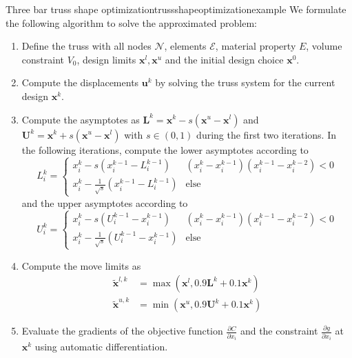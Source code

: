 \begin{example}{Three bar truss shape optimization}{trussshapeoptimizationexample}
    We formulate the following algorithm to solve the approximated problem: 
    \begin{enumerate}
        \item Define the truss with all nodes $\mathcal{N}$, elements $\mathcal{E}$, material property $E$, volume constraint $V_0$, design limits $\mathbf{x}^l, \mathbf{x}^u$ and the initial design choice $\mathbf{x}^0$.
        \item Compute the displacements $\mathbf{u}^k$ by solving the truss system for the current design $\mathbf{x}^k$.
        \item Compute the asymptotes as $\mathbf{L}^k =\mathbf{x}^k - s (\mathbf{x}^u - \mathbf{x}^l)$ and $\mathbf{U}^k =\mathbf{x}^k + s (\mathbf{x}^u - \mathbf{x}^l)$ with $s \in (0,1)$ during the first two iterations. In the following iterations, compute the lower asymptotes according to 
        \begin{equation}
            L^k_i = 
            \begin{cases}
                x^k_i - s  (x^{k-1}_i-L^{k-1}_i) & (x_i^k-x_i^{k-1})(x_i^{k-1}-x_i^{k-2}) < 0\\
                x^k_i - \frac{1}{\sqrt{s}}  (x^{k-1}_i-L^{k-1}_i) & \text{else}
            \end{cases}
        \end{equation}
        and the upper asymptotes according to 
        \begin{equation}
            U^k_i = 
            \begin{cases}
                x^k_i - s  (U^{k-1}_i-x^{k-1}_i) & (x_i^k-x_i^{k-1})(x_i^{k-1}-x_i^{k-2}) < 0\\
                x^k_i - \frac{1}{\sqrt{s}}  (U^{k-1}_i-x^{k-1}_i) & \text{else}
            \end{cases}
        \end{equation}

        \item Compute the move limits as 
        \begin{align}
            \tilde{\mathbf{x}}^{l,k} &= \max(\mathbf{x}^l,  0.9 \mathbf{L}^k + 0.1 \mathbf{x}^k) \\
            \tilde{\mathbf{x}}^{u,k} &= \min(\mathbf{x}^u,  0.9 \mathbf{U}^k + 0.1 \mathbf{x}^k)
        \end{align}

        \item Evaluate the gradients of the objective function $\frac{\partial C}{\partial x_i}$ and the constraint $\frac{\partial g}{\partial x_i}$ at $\mathbf{x}^k$ using automatic differentiation. 


\end{enumerate}
\end{example}
